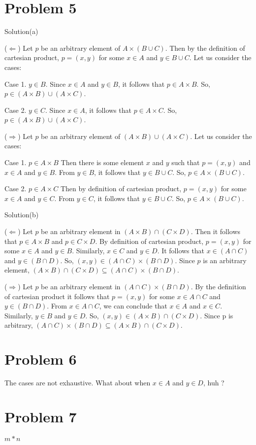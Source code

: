 \documentclass{article}
\begin{document}
\section{Problem 5}

Solution(a)

($ \Leftarrow $) Let $p$ be an arbitrary element of $A \times (B \cup C)$. Then by the
definition of cartesian product, $p = (x,y)$ for some $x \in A$ and $y
\in B \cup C$. Let us consider the cases:

Case 1. $y \in B$. Since $x \in A$ and $y \in B$, it follows that $p
\in A \times B$. So, $p \in (A \times B) \cup (A \times C)$.

Case 2. $y \in C$. Since $x \in A$, it follows that $p \in A \times
C$. So, $p \in (A \times B) \cup (A \times C)$.

($ \Rightarrow $) Let $p$ be an arbitrary element of $(A \times B)
\cup (A \times C)$. Let us consider the cases:

Case 1. $p \in A \times B$ Then there is some element $x$ and $y$ such
that $p = (x,y)$ and $x \in A$ and $y \in B$. From $y \in B$, it
follows that $y \in B \cup C$. So, $p \in A \times (B \cup C)$.

Case 2. $p \in A \times C$ Then by definition of cartesian product, $p
= (x,y)$ for some $x \in A$ and $y \in C$. From $y \in C$, it follows
that $y \in B \cup C$. So, $p \in A \times (B \cup C)$.

Solution(b)

($ \Leftarrow $) Let $p$ be an arbitrary element in $(A \times B) \cap
(C \times D)$. Then it follows that $p \in A \times B$ and $p \in C
\times D$. By definition of cartesian product, $p = (x,y)$ for some $x
\in A$ and $y \in B$. Similarly, $x \in C$ and $y \in D$. It follows
that $x \in (A \cap C)$ and $y \in (B \cap D)$. So, $(x,y) \in (A \cap
C) \times (B \cap D)$. Since $p$ is an arbitrary element, $(A \times
B) \cap (C \times D) \subseteq (A \cap C) \times (B \cap D)$.

($ \Rightarrow $) Let $p$ be an arbitrary element in $(A \cap C)
\times (B \cap D)$. By the definition of cartesian product it follows
that $p = (x,y)$ for some $x \in A \cap C$ and $y \in (B \cap D)$.
From $x \in A \cap C$, we can conclude that $x \in A$ and $x \in C$.
Similarly, $y \in B$ and $y \in D$. So, $(x,y) \in (A \times B) \cap
(C \times D)$. Since p is arbitrary, $(A \cap C) \times (B \cap D)
\subseteq (A \times B) \cap (C \times D)$.

\section{Problem 6}

The cases are not exhaustive. What about when $x \in A$ and $y \in D$,
huh ?

\section{Problem 7}

$ m * n$
\end{document}
